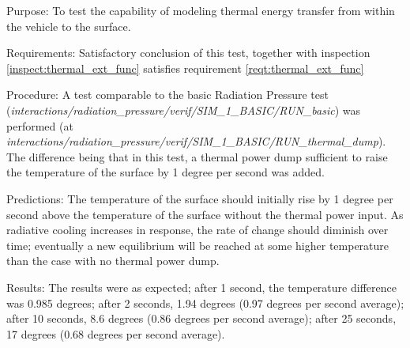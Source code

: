  \label{test:intravehicularthermaltransfer}
\begin{description}
\item{Purpose:}\newline
To test the capability of modeling thermal energy transfer from within the vehicle to the surface.
\item{Requirements:}\newline
Satisfactory conclusion of this test, together with inspection \ref{inspect:thermal_ext_func} satisfies requirement \ref{reqt:thermal_ext_func}
\item{Procedure:}\newline
A test comparable to the basic Radiation Pressure test \newline
(\textit{interactions/radiation\_pressure/verif/SIM\_1\_BASIC/RUN\_basic}) was
performed (at \textit{interactions/radiation\_pressure/verif/SIM\_1\_BASIC/RUN\_thermal\_dump}).  The difference being that in this test, a thermal power dump sufficient to raise the temperature of the surface by 1 degree per second was added.
\item{Predictions:}\newline
The temperature of the surface should initially rise by 1 degree per second above the temperature of the surface without the thermal power input.  As radiative cooling increases in response, the rate of change should diminish over time; eventually a new equilibrium will be reached at some higher temperature than the case with no thermal power dump.
\item{Results:}\newline
The results were as expected; after 1 second, the temperature difference was 0.985 degrees; after 2 seconds, 1.94 degrees (0.97 degrees per second average); after 10 seconds, 8.6 degrees (0.86 degrees per second average); after 25 seconds, 17 degrees (0.68 degrees per second average).

\end{description}
